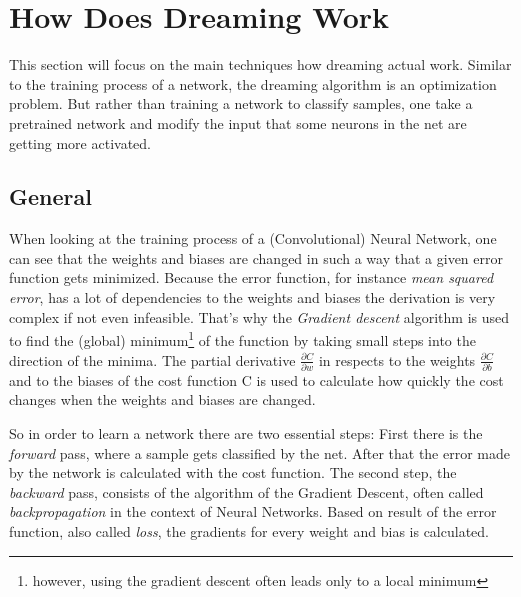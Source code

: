 

\section{How Does Dreaming Work}
\label{sec:how}

This section will focus on the main techniques how dreaming actual work.
Similar to the training process of a network, the dreaming algorithm is an optimization problem.
But rather than training a network to classify samples, one take a pretrained network and modify the input that some neurons in the net are getting more activated.


\subsection{General}
When looking at the training process of a (Convolutional) Neural Network, one can see that the weights and biases are changed in such a way that a given error function gets minimized.
Because the error function, for instance \emph{mean squared error}, has a lot of dependencies to the weights and biases the derivation is very complex if not even infeasible.
That's why the \emph{Gradient descent} algorithm is used to find the (global) minimum\footnote{however, using the gradient descent often leads only to a local minimum} of the function by taking small steps into the direction of the minima.
The partial derivative $\frac{\partial C}{\partial w}$ in respects to the weights	$\frac{\partial C}{\partial b}$ and to the biases of the cost function C is used to calculate how quickly the cost changes when the weights and biases are changed.

So in order to learn a network there are two essential steps:
First there is the \emph{forward} pass, where a sample gets classified by the net.
After that the error made by the network is calculated with the cost function.
The second step, the \emph{backward} pass, consists of the algorithm of the Gradient Descent, often called \emph{backpropagation} in the context of Neural Networks.
Based on result of the error function, also called \emph{loss}, the gradients for every weight and bias is calculated.

